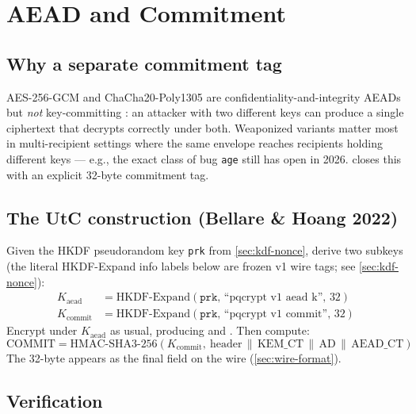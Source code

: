 \section{AEAD and Commitment}
\label{sec:aead-commitment}

\subsection{Why a separate commitment tag}

AES-256-GCM and ChaCha20-Poly1305 are confidentiality-and-integrity AEADs but \emph{not} key-committing \citep{grubbs2017aead}: an attacker with two different keys can produce a single ciphertext that decrypts correctly under both. Weaponized variants \citep{albertini2020aead,len2021aead} matter most in multi-recipient settings where the same envelope reaches recipients holding different keys --- e.g., the exact class of bug \texttt{age} still has open in 2026. \pqcrypt{} closes this with an explicit 32-byte commitment tag.

\subsection{The UtC construction (Bellare \& Hoang 2022)}

Given the HKDF pseudorandom key \texttt{prk} from \cref{sec:kdf-nonce}, derive two subkeys
(the literal HKDF-Expand info labels below are frozen v1 wire tags; see \cref{sec:kdf-nonce}):
\begin{align*}
K_{\mathrm{aead}}   &= \mathrm{HKDF\text{-}Expand}(\texttt{prk},\, \text{``pqcrypt v1 aead k''},\, 32) \\
K_{\mathrm{commit}} &= \mathrm{HKDF\text{-}Expand}(\texttt{prk},\, \text{``pqcrypt v1 commit''},\, 32)
\end{align*}
Encrypt under $K_{\mathrm{aead}}$ as usual, producing  and . Then compute:
$$
\mathrm{COMMIT} = \mathrm{HMAC\text{-}SHA3\text{-}256}\!\left(K_{\mathrm{commit}},\ \mathrm{header} \,\|\, \mathrm{KEM\_CT} \,\|\, \mathrm{AD} \,\|\, \mathrm{AEAD\_CT}\right)
$$
The 32-byte  appears as the final field on the wire (\cref{sec:wire-format}).

\subsection{Verification}

